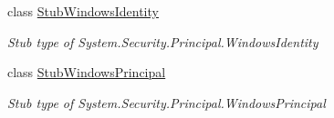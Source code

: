 \begin{DoxyCompactItemize}
class \hyperlink{class_system_1_1_security_1_1_principal_1_1_fakes_1_1_stub_windows_identity}{Stub\-Windows\-Identity}
\begin{DoxyCompactList}\small\item\em Stub type of System.\-Security.\-Principal.\-Windows\-Identity\end{DoxyCompactList}\item 
class \hyperlink{class_system_1_1_security_1_1_principal_1_1_fakes_1_1_stub_windows_principal}{Stub\-Windows\-Principal}
\begin{DoxyCompactList}\small\item\em Stub type of System.\-Security.\-Principal.\-Windows\-Principal\end{DoxyCompactList}\end{DoxyCompactItemize}
